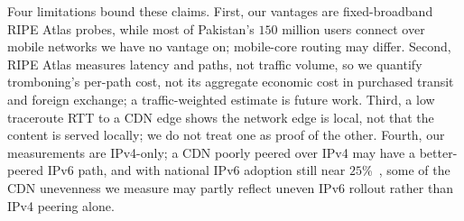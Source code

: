 \documentclass[sigconf,anonymous,10pt]{acmart}
\newcommand{\hlnew}[1]{{\sethlcolor{newhl}\hl{#1}}}
\begin{document}
Four limitations bound these claims. First, our vantages are fixed-broadband RIPE Atlas probes, while most of Pakistan's $150$ million users connect over mobile networks we have no vantage on; mobile-core routing may differ. %
Second, RIPE Atlas measures latency and paths, not traffic volume, so we quantify tromboning's per-path cost, not its aggregate economic cost in purchased transit and foreign exchange; a traffic-weighted estimate is future work. Third, a low traceroute RTT to a CDN edge shows the network edge is local, not that the content is served locally; we do not treat one as proof of the other. Fourth, our measurements are IPv4-only; a CDN poorly peered over IPv4 may have a better-peered IPv6 path, and with national IPv6 adoption still near $25$\%~\cite{pta2026telecom}, some of the CDN unevenness we measure may partly reflect uneven IPv6 rollout rather than IPv4 peering alone.
\end{document}
